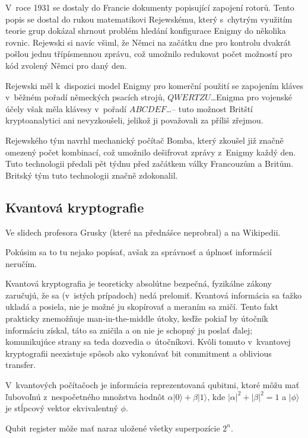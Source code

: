 V~roce 1931 se dostaly do Francie dokumenty popisující zapojení rotorů.
Tento popis se dostal do rukou matematikovi Rejewskému,
který s~chytrým využitím teorie grup dokázal shrnout problém hledání
konfigurace Enigmy do několika rovnic.
Rejewski si navíc všiml, že Němci na začátku dne pro kontrolu dvakrát pošlou jednu
třípísmennou zprávu, což umožnilo redukovat počet možností pro kód
zvolený Němci pro daný den.

Rejewski měl k~dispozici model Enigmy pro komerční použití se zapojením
kláves v~běžném pořadí německých psacích strojů, $QWERTZU$\ldots Enigma
pro vojenské účely však měla klávesy v~pořadí $ABCDEF$\ldots -- tuto
možnost Britští kryptoanalytici ani nevyzkoušeli, jelikož ji považovali
za příliš zřejmou.

Rejewského tým navrhl mechanický počítač Bomba, který zkoušel již značně
omezený počet kombinací, což umožnilo dešifrovat zprávy z~Enigmy každý
den. Tuto technologii předali pět týdnu před začátkem války Francouzům a
Britům. Britský tým tuto technologii značně zdokonalil.

\subsection{Kvantová kryptografie}

Ve slidech profesora Grusky (které na přednášce neprobral)
a na Wikipedii.

Pokúsim sa to tu nejako popísať, avšak za správnosť a úplnosť informácií
neručím.

Kvantová kryptografia je teoreticky absolútne bezpečná, fyzikálne
zákony zaručujú, že sa (v~istých prípadoch) nedá prelomiť. Kvantová
informácia sa ťažko ukladá a posiela, nie je možné ju skopírovať
a meraním sa zničí. Tento fakt prakticky znemožňuje man-in-the-middle
útoky, keďže pokiaľ by útočník informáciu získal, táto sa zničila
a on nie je schopný ju poslať ďalej; komunikujúce strany sa teda 
dozvedia o~útočníkovi. Kvôli tomuto v~kvantovej kryptografii
neexistuje spôsob ako vykonávať bit commitment a oblivious transfer.

V~kvantových počítačoch je informácia reprezentovaná qubitmi,
ktoré môžu mať ľubovoľnú z~nespočetného množstva hodnôt 
$\alpha|0\rangle + \beta|1\rangle$, kde $|\alpha|^2+|\beta|^2=1$ a 
$|\phi\rangle$ je stĺpcový vektor ekvivalentný $\phi$.

Qubit register môže mať naraz uložené všetky superpozície $2^n$.

